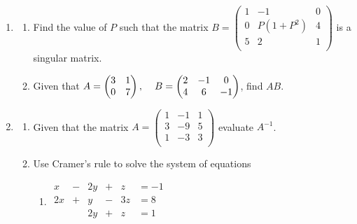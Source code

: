 \documentclass[11pt,a4paper]{article}
\begin{document}
\begin{enumerate}
\begin{enumerate}
\item \hspace{0.4cm}
$
\begin{matrix}
x & - & 2y & + & 3z & = 9\\
2x & + & 3y & - & z & =4\\
x & + & 5y & - & 4z & =2\\
\end{matrix}
$
\end{enumerate}



\item
\begin{enumerate}
\item Find the value of $P$ such that the matrix $B=
\begin{pmatrix}
1 & -1 & 0\\
0 & P(1 +P^2) & 4\\
5 & 2 & 1\\
\end{pmatrix}
$ is a singular matrix.\\

\item Given that $ A=
\begin{pmatrix}
3 & 1\\
0 & 7\\
\end{pmatrix}
, \hspace{0.4cm}
B=
\begin{pmatrix}
2 & -1 & 0\\
4 & 6 & -1\\
\end{pmatrix}
$, find $AB$.\\
\end{enumerate}

\item
\begin{enumerate}
\item Given that the matrix $A=
\begin{pmatrix}
1 & -1 & 1\\
3 & -9 & 5\\
1 & -3 & 3\\
\end{pmatrix}
$ evaluate $A^{-1}$.\\

\item Use Cramer's rule to solve the system of equations 
\begin{enumerate}
\item \hspace{0.4cm}
$
\begin{matrix}
x & - & 2y & + & z & =-1\\
2x & + & y & - & 3z & = 8\\
&& 2y & + & z & =1\\
\end{matrix}
$\\\\


\end{enumerate}
\end{enumerate}
\end{enumerate}
\end{document}
